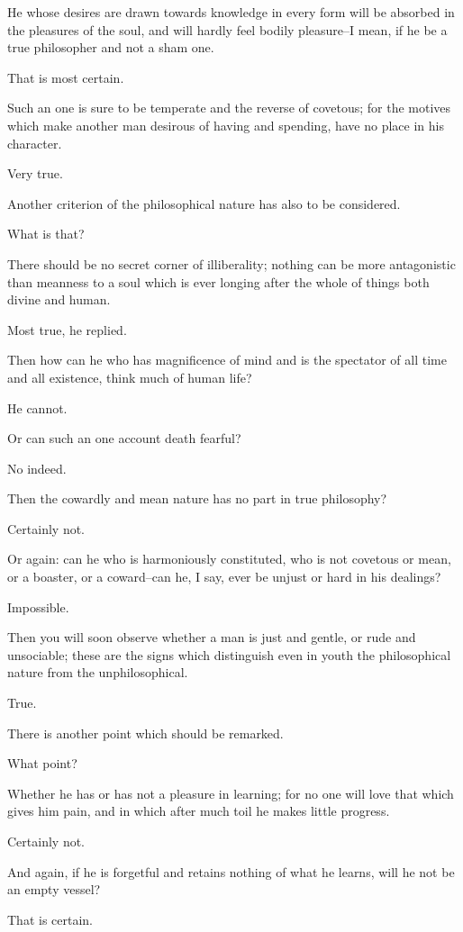 He whose desires are drawn towards knowledge in every form will be
absorbed in the pleasures of the soul, and will hardly feel bodily
pleasure--I mean, if he be a true philosopher and not a sham one.

That is most certain.

Such an one is sure to be temperate and the reverse of covetous; for the
motives which make another man desirous of having and spending, have no
place in his character.

Very true.

Another criterion of the philosophical nature has also to be considered.

What is that?

There should be no secret corner of illiberality; nothing can be more
antagonistic than meanness to a soul which is ever longing after the
whole of things both divine and human.

Most true, he replied.

Then how can he who has magnificence of mind and is the spectator of all
time and all existence, think much of human life?

He cannot.

Or can such an one account death fearful?

No indeed.

Then the cowardly and mean nature has no part in true philosophy?

Certainly not.

Or again: can he who is harmoniously constituted, who is not covetous or
mean, or a boaster, or a coward--can he, I say, ever be unjust or hard
in his dealings?

Impossible.

Then you will soon observe whether a man is just and gentle, or rude
and unsociable; these are the signs which distinguish even in youth the
philosophical nature from the unphilosophical.

True.

There is another point which should be remarked.

What point?

Whether he has or has not a pleasure in learning; for no one will love
that which gives him pain, and in which after much toil he makes little
progress.

Certainly not.

And again, if he is forgetful and retains nothing of what he learns,
will he not be an empty vessel?

That is certain.

